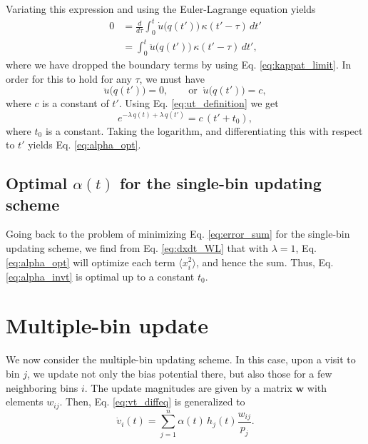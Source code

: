 \documentclass[reprint]{revtex4-1}
\begin{document}
Variating this expression and
using the Euler-Lagrange equation yields
$$
\begin{aligned}
0
&=
\frac{d}{d\tau} \int_0^t
  \dot u\bigl( q(t') \bigr) \, \kappa(t' - \tau) \, dt'
\\
&= \int_0^t
  \ddot u\bigl( q(t') \bigr) \, \kappa(t' - \tau) \, dt',
\end{aligned}
$$
where we have dropped the boundary terms
by using Eq. \eqref{eq:kappat_limit}.
%
%
In order for this to hold for any $\tau$,
we must have
%
\begin{equation}
\ddot u\bigl( q(t') \bigr) = 0,
\qquad
\mathrm{or}
\;\;
\dot u\bigl( q(t') \bigr) = c,
\label{eq:ddu_eq_0}
\end{equation}
%
where $c$ is a constant of $t'$.
%
Using Eq. \eqref{eq:ut_definition}
we get
$$
e^{-\lambda \, q(t) + \lambda \, q(t')}
=
c \, (t' + t_0),
$$
where $t_0$ is a constant.
%
Taking the logarithm, and differentiating this with respect to $t'$
yields Eq. \eqref{eq:alpha_opt}.



\subsection{Optimal $\alpha(t)$ for the single-bin updating scheme}



Going back to the problem of
minimizing Eq. \eqref{eq:error_sum}
for the single-bin updating scheme,
we find from Eq. \eqref{eq:dxdt_WL}
that with $\lambda = 1$,
Eq. \eqref{eq:alpha_opt}
will optimize each term $\langle x_i^2 \rangle$,
and hence the sum.
%
Thus, Eq. \eqref{eq:alpha_invt} is optimal
up to a constant $t_0$. %



\section{\label{sec:multiple-bin}
Multiple-bin update}



We now consider the multiple-bin updating scheme.
%
In this case,
upon a visit to bin $j$,
we update not only the bias potential there,
but also those for a few neighboring bins $i$.
%
The update magnitudes are given by a matrix $\mathbf w$
with elements $w_{ij}$.
%
Then, Eq. \eqref{eq:vt_diffeq} is generalized to
\begin{equation}
  \dot v_i(t) =
  \sum_{j=1}^n \alpha(t) \, h_j(t) \frac{ w_{ij} } { p_j }.
  \label{eq:vt_diffeq_mbin}
\end{equation}
\end{document}
